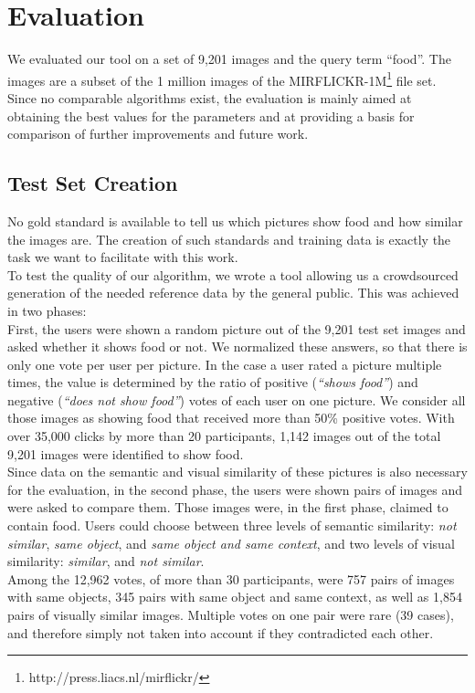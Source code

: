 %
\section{Evaluation}
\label{sec_evaluation}

We evaluated our tool on a set of 9,201 images and the query term ``food''. The images are a subset of the 1 million images of the MIRFLICKR-1M\footnote{http://press.liacs.nl/mirflickr/} file set. Since no comparable algorithms exist, the evaluation is mainly aimed at obtaining the best values for the parameters and at providing a basis for comparison of further improvements and future work.

\subsection{Test Set Creation}
\label{sec_testset}
No gold standard is available to tell us which pictures show food and how similar the images are. The creation of such standards and training data is exactly the task we want to facilitate with this work.\\
To test the quality of our algorithm, we wrote a tool allowing us a crowdsourced generation of the needed reference data by the general public. This was achieved in two phases:\\

First, the users were shown a random picture out of the 9,201 test set images and asked whether it shows food or not. We normalized these answers, so that there is only one vote per user per picture. In the case a user rated a picture multiple times, the value is determined by the ratio of positive (\emph{``shows food''}) and negative (\emph{``does not show food''}) votes of each user on one picture. We consider all those images as showing food that received more than 50\% positive votes. With over 35,000 clicks by more than 20 participants, 1,142 images out of the total 9,201 images were identified to show food. \\

Since data on the semantic and visual similarity of these pictures is also necessary for the evaluation, in the second phase, the users were shown pairs of images and were asked to compare them. Those images were, in the first phase, claimed to contain food. Users could choose between three levels of semantic similarity: \emph{not similar}, \emph{same object}, and \emph{same object and same context}, and two levels of visual similarity: \emph{similar}, and \emph{not similar}.\\
Among the 12,962 votes, of more than 30 participants, were 757 pairs of images with same objects, 345 pairs with same object and same context, as well as 1,854 pairs of visually similar images. Multiple votes on one pair were rare (39 cases), and therefore simply not taken into account if they contradicted each other.

